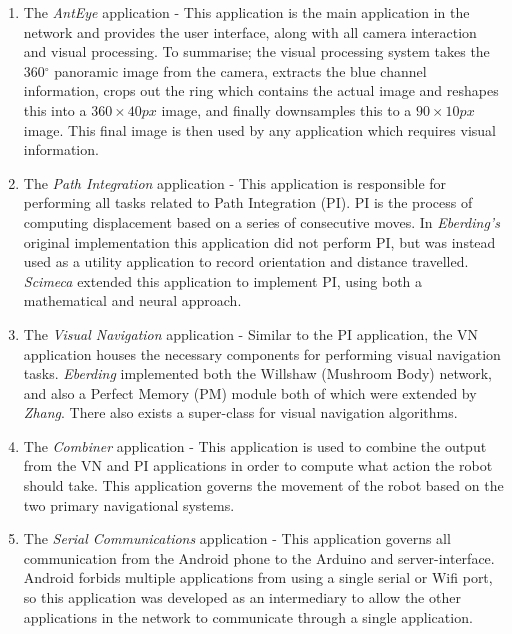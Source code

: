 \documentclass[a4paper,12pt,twoside,openright]{article}
\begin{document}
\begin{enumerate}
\item{
    The \textit{AntEye} application - This application is the main application in the network and
    provides the user interface, along with all camera interaction and visual processing. To summarise;
    the visual processing system takes the 360$^{\circ}$ panoramic image from the camera, extracts
    the blue channel information, crops out the ring which contains the actual image and reshapes
    this into a $360\times40px$ image, and finally downsamples this to a $90\times10px$ image. This
    final image is then used by any application which requires visual information.
  }

\item{
    The \textit{Path Integration} application - This application is responsible for performing all
    tasks related to Path Integration (PI). PI is the process of computing displacement
    based on a series of consecutive moves. In \textit{Eberding's} original implementation this
    application did not perform PI, but was instead used as a utility application to record orientation
    and distance travelled. \textit{Scimeca} extended this application to implement PI, using both a
    mathematical and neural approach.
  }

\item{
    The \textit{Visual Navigation} application - Similar to the PI application, the VN application
    houses the necessary components for performing visual navigation tasks. \textit{Eberding}
    implemented both the Willshaw (Mushroom Body) network, and also a Perfect Memory (PM) module both
    of which were extended by \textit{Zhang}. There also exists a super-class for visual navigation
    algorithms.
    }

\item{
    The \textit{Combiner} application - This application is used to combine the output from the
    VN and PI applications in order to compute what action the robot should take. This application
    governs the movement of the robot based on the two primary navigational systems.
  }

\item{
    The \textit{Serial Communications} application - This application governs all communication from
    the Android phone to the Arduino and server-interface. Android forbids multiple applications from
    using a single serial or Wifi port, so this application was developed as an intermediary to allow
    the other applications in the network to communicate through a single application.
    }
\end{enumerate}
\end{document}
